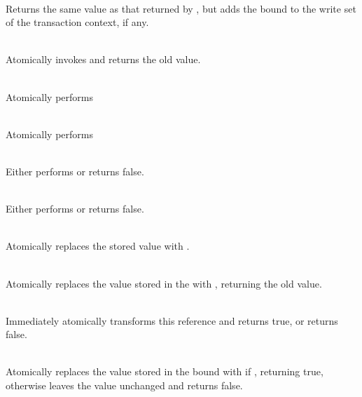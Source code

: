 {\vspace{3pt}

\\ Returns the same value as
that returned by , but adds the bound  to the write
set of the transaction context, if any.

\code{): }\\ Atomically
invokes  and returns the old value.

\code{): }\\
Atomically performs
\code{ \}}

\code{): }\\
Atomically performs
\code{ \}}

\code{): }\\
Either performs  or returns false.

\code{): }\\
Either performs  or returns false.

\code{ => }\code{) }\\
Atomically replaces the stored value  with .

\code{ => }\code{): }\\
Atomically replaces the value  stored in the 
with , returning the old value.

\code{ => }\code{): } \\
Immediately atomically transforms this reference and returns true,
or returns false.

\code{[}\code{,}\code{]):}
\\
Atomically replaces the value  stored in the bound 
with  if , returning true, otherwise
leaves the value unchanged and returns false.

}

